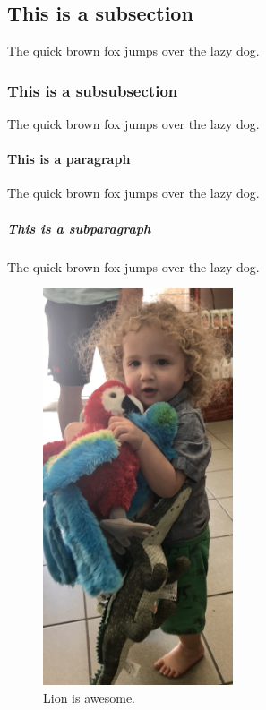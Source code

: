 \documentclass{article}
\begin{document}
\subsection{This is a subsection}
The quick brown fox jumps over the lazy dog.

\subsubsection{This is a subsubsection}
The quick brown fox jumps over the lazy dog.

\paragraph{This is a paragraph}
The quick brown fox jumps over the lazy dog.

\subparagraph{This is a subparagraph}
The quick brown fox jumps over the lazy dog.

\begin{figure}
\centering
\includegraphics[width=0.5\textwidth]{lion_parrots.JPG}
  \caption{Lion is awesome.}
\label{fig:lion}
\end{figure}
\end{document}
